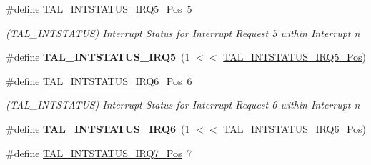 \begin{DoxyCompactItemize}
\item 
\hypertarget{group___s_a_m_l21___t_a_l_gaf81bb8439e300967b8233ec81fb8ae15}{}\#define \hyperlink{group___s_a_m_l21___t_a_l_gaf81bb8439e300967b8233ec81fb8ae15}{T\+A\+L\+\_\+\+I\+N\+T\+S\+T\+A\+T\+U\+S\+\_\+\+I\+R\+Q5\+\_\+\+Pos}~5\label{group___s_a_m_l21___t_a_l_gaf81bb8439e300967b8233ec81fb8ae15}

\begin{DoxyCompactList}\small\item\em (T\+A\+L\+\_\+\+I\+N\+T\+S\+T\+A\+T\+U\+S) Interrupt Status for Interrupt Request 5 within Interrupt n \end{DoxyCompactList}\item 
\hypertarget{group___s_a_m_l21___t_a_l_gac9d5d947cca50e5d862f108fd40b83f8}{}\#define {\bfseries T\+A\+L\+\_\+\+I\+N\+T\+S\+T\+A\+T\+U\+S\+\_\+\+I\+R\+Q5}~(1 $<$$<$ \hyperlink{group___s_a_m_l21___t_a_l_gaf81bb8439e300967b8233ec81fb8ae15}{T\+A\+L\+\_\+\+I\+N\+T\+S\+T\+A\+T\+U\+S\+\_\+\+I\+R\+Q5\+\_\+\+Pos})\label{group___s_a_m_l21___t_a_l_gac9d5d947cca50e5d862f108fd40b83f8}

\item 
\hypertarget{group___s_a_m_l21___t_a_l_gac0f3d4cd0f6c80c52c00bfcfd54e0d35}{}\#define \hyperlink{group___s_a_m_l21___t_a_l_gac0f3d4cd0f6c80c52c00bfcfd54e0d35}{T\+A\+L\+\_\+\+I\+N\+T\+S\+T\+A\+T\+U\+S\+\_\+\+I\+R\+Q6\+\_\+\+Pos}~6\label{group___s_a_m_l21___t_a_l_gac0f3d4cd0f6c80c52c00bfcfd54e0d35}

\begin{DoxyCompactList}\small\item\em (T\+A\+L\+\_\+\+I\+N\+T\+S\+T\+A\+T\+U\+S) Interrupt Status for Interrupt Request 6 within Interrupt n \end{DoxyCompactList}\item 
\hypertarget{group___s_a_m_l21___t_a_l_ga3b589873a14920b1998c4db3bd2b3a8a}{}\#define {\bfseries T\+A\+L\+\_\+\+I\+N\+T\+S\+T\+A\+T\+U\+S\+\_\+\+I\+R\+Q6}~(1 $<$$<$ \hyperlink{group___s_a_m_l21___t_a_l_gac0f3d4cd0f6c80c52c00bfcfd54e0d35}{T\+A\+L\+\_\+\+I\+N\+T\+S\+T\+A\+T\+U\+S\+\_\+\+I\+R\+Q6\+\_\+\+Pos})\label{group___s_a_m_l21___t_a_l_ga3b589873a14920b1998c4db3bd2b3a8a}

\item 
\hypertarget{group___s_a_m_l21___t_a_l_ga9b599baae0a3a68405e6f8724eaa53c5}{}\#define \hyperlink{group___s_a_m_l21___t_a_l_ga9b599baae0a3a68405e6f8724eaa53c5}{T\+A\+L\+\_\+\+I\+N\+T\+S\+T\+A\+T\+U\+S\+\_\+\+I\+R\+Q7\+\_\+\+Pos}~7\label{group___s_a_m_l21___t_a_l_ga9b599baae0a3a68405e6f8724eaa53c5}


\end{DoxyCompactItemize}

